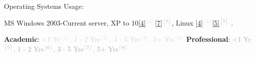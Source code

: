 \begin{cventries}
  \cventry
    {Operating Systems Usage:} %
    {} 
    {} 
    {} 
    {
      \vspace{0.1cm}
      \begin{cvitems} %
        \item[] {
        \textcolor{rainbowcolor-orange}{MS Windows 2003-Current server, XP to 10\textcolor{lightgray}{\ref{4}{$^{[4]}$}}\textcolor{darkgray}{\ref{7}{$^{[7]}$}}}, 
        \textcolor{rainbowcolor-orange}{Linux%
\textcolor{lightgray}{\ref{4}{$^{[4]}$}}\textcolor{darkgray}{\ref{5}{$^{[5]}$}}}%
        .} 
      \end{cvitems}
    }  
  \vspace{-0.6cm} 
    

  \cventry
    {} %
    {} 
    {} 
    {} 
    {
      \begin{cvitems} %
        \item[]{\textbf{Academic}: \textcolor{lightgray}{\label{1}{<1 Yr$^{[1]}$}, \label{2}{1 - 2 Yrs$^{[2]}$}, \label{3}{3 - 5 Yrs$^{[3]}$}, \label{4}{5+ Yrs$^{[4]}$}}%
		\hspace{2.2cm}
		\textbf{Professional}: \textcolor{darkgray}{\label{5}{<1 Yr$^{[5]}$}, \label{6}{1 - 2 Yrs$^{[6]}$}, \label{7}{3 - 5 Yrs$^{[7]}$}, \label{8}{5+ Yrs$^{[8]}$}}}		
      \end{cvitems}
    }  
  \vspace{0.2cm} 
      

\end{cventries}